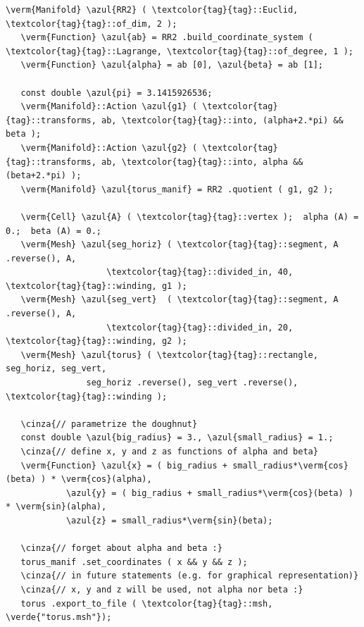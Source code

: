 \begin{Verbatim}[commandchars=\\\{\},formatcom=\small\tt,frame=single,
   label=parag-\ref{\numb section 7.\numb parag 5}.cpp,rulecolor=\color{coment},
   baselinestretch=0.94,framesep=2mm                                            ]
   \verm{Manifold} \azul{RR2} ( \textcolor{tag}{tag}::Euclid, \textcolor{tag}{tag}::of_dim, 2 );
   \verm{Function} \azul{ab} = RR2 .build_coordinate_system ( \textcolor{tag}{tag}::Lagrange, \textcolor{tag}{tag}::of_degree, 1 );
   \verm{Function} \azul{alpha} = ab [0], \azul{beta} = ab [1];

   const double \azul{pi} = 3.1415926536;
   \verm{Manifold}::Action \azul{g1} ( \textcolor{tag}{tag}::transforms, ab, \textcolor{tag}{tag}::into, (alpha+2.*pi) && beta );
   \verm{Manifold}::Action \azul{g2} ( \textcolor{tag}{tag}::transforms, ab, \textcolor{tag}{tag}::into, alpha && (beta+2.*pi) );
   \verm{Manifold} \azul{torus_manif} = RR2 .quotient ( g1, g2 );

   \verm{Cell} \azul{A} ( \textcolor{tag}{tag}::vertex );  alpha (A) = 0.;  beta (A) = 0.;
   \verm{Mesh} \azul{seg_horiz} ( \textcolor{tag}{tag}::segment, A .reverse(), A,
                    \textcolor{tag}{tag}::divided_in, 40, \textcolor{tag}{tag}::winding, g1 );
   \verm{Mesh} \azul{seg_vert}  ( \textcolor{tag}{tag}::segment, A .reverse(), A,
                    \textcolor{tag}{tag}::divided_in, 20, \textcolor{tag}{tag}::winding, g2 );
   \verm{Mesh} \azul{torus} ( \textcolor{tag}{tag}::rectangle, seg_horiz, seg_vert,
                seg_horiz .reverse(), seg_vert .reverse(), \textcolor{tag}{tag}::winding );

   \cinza{// parametrize the doughnut}
   const double \azul{big_radius} = 3., \azul{small_radius} = 1.;
   \cinza{// define x, y and z as functions of alpha and beta}
   \verm{Function} \azul{x} = ( big_radius + small_radius*\verm{cos}(beta) ) * \verm{cos}(alpha),
            \azul{y} = ( big_radius + small_radius*\verm{cos}(beta) ) * \verm{sin}(alpha),
            \azul{z} = small_radius*\verm{sin}(beta);

   \cinza{// forget about alpha and beta :}
   torus_manif .set_coordinates ( x && y && z );
   \cinza{// in future statements (e.g. for graphical representation)}
   \cinza{// x, y and z will be used, not alpha nor beta :}
   torus .export_to_file ( \textcolor{tag}{tag}::msh, \verde{"torus.msh"});
\end{Verbatim}


